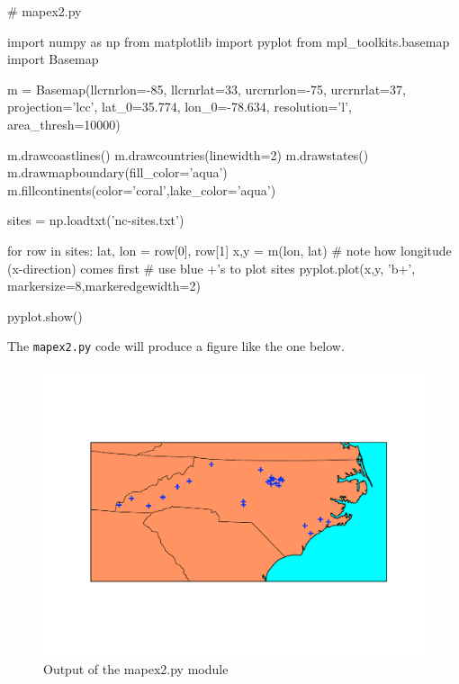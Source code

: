 \begin{codeblock}[python]
# mapex2.py

import numpy as np
from matplotlib import pyplot
from mpl_toolkits.basemap import Basemap

m = Basemap(llcrnrlon=-85, llcrnrlat=33, urcrnrlon=-75,
  urcrnrlat=37, projection='lcc', lat_0=35.774, lon_0=-78.634,
  resolution='l', area_thresh=10000)

m.drawcoastlines()
m.drawcountries(linewidth=2)
m.drawstates()
m.drawmapboundary(fill_color='aqua')
m.fillcontinents(color='coral',lake_color='aqua')

sites = np.loadtxt('nc-sites.txt')

for row in sites:
    lat, lon = row[0], row[1]
    x,y = m(lon, lat) # note how longitude (x-direction) comes first
    # use blue +'s to plot sites
    pyplot.plot(x,y, 'b+', markersize=8,markeredgewidth=2) 

pyplot.show()    
\end{codeblock}
%
The \lstinline!mapex2.py! code will produce a figure like the one below.

\begin{figure}[htbp]
\centering
\includegraphics[width=0.6\columnwidth]{./figures/hands-on3/mapfig.pdf}
\caption{Output of the mapex2.py module}
\end{figure}

